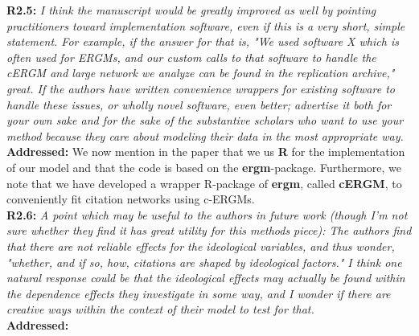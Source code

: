 \documentclass[a4paper,11pt]{texMemo}
\begin{document}
\noindent \textbf{R2.5:} \emph{ I think the manuscript would be greatly improved as well by pointing practitioners toward implementation software, even if this is a very short, simple statement. For example, if the answer for that is, "We used software X which is often used for ERGMs, and our custom calls to that software to handle the cERGM and large network we analyze can be found in the replication archive," great. If the authors have written convenience wrappers for existing software to handle these issues, or wholly novel software, even better; advertise it both for your own sake and for the sake of the substantive scholars who want to use your method because they care about modeling their data in the most appropriate way.}\\

\noindent \textbf{Addressed:} We now mention in the paper that we us \textbf{R} for the implementation of our model and that the code is based on the \textbf{ergm}-package. Furthermore, we note that we have developed a wrapper R-package of \textbf{ergm}, called \textbf{cERGM}, to conveniently fit citation networks using c-ERGMs.  \\

\noindent \textbf{R2.6:} \emph{ A point which may be useful to the authors in future work (though I'm not sure whether they find it has great utility for this methods piece): The authors find that there are not reliable effects for the ideological variables, and thus wonder, "whether, and if so, how, citations are shaped by ideological factors." I think one natural response could be that the ideological effects may actually be found within the dependence effects they investigate in some way, and I wonder if there are creative ways within the context of their model to test for that.}\\

\noindent \textbf{Addressed:}  \\


\printbibliography
\end{document}
